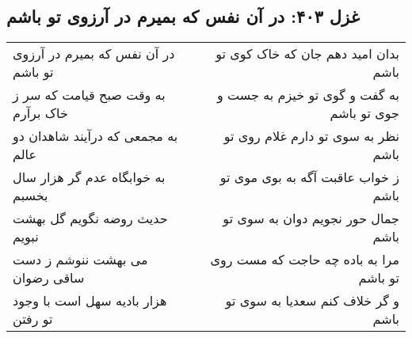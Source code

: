\begin{center}
\section*{غزل ۴۰۳: در آن نفس که بمیرم در آرزوی تو باشم}
\label{sec:403}
\begin{longtable}{l p{0.5cm} r}
در آن نفس که بمیرم در آرزوی تو باشم
&&
بدان امید دهم جان که خاک کوی تو باشم
\\
به وقت صبح قیامت که سر ز خاک برآرم
&&
به گفت و گوی تو خیزم به جست و جوی تو باشم
\\
به مجمعی که درآیند شاهدان دو عالم
&&
نظر به سوی تو دارم غلام روی تو باشم
\\
به خوابگاه عدم گر هزار سال بخسبم
&&
ز خواب عاقبت آگه به بوی موی تو باشم
\\
حدیث روضه نگویم گل بهشت نبویم
&&
جمال حور نجویم دوان به سوی تو باشم
\\
می بهشت ننوشم ز دست ساقی رضوان
&&
مرا به باده چه حاجت که مست روی تو باشم
\\
هزار بادیه سهل است با وجود تو رفتن
&&
و گر خلاف کنم سعدیا به سوی تو باشم
\\
\end{longtable}
\end{center}
